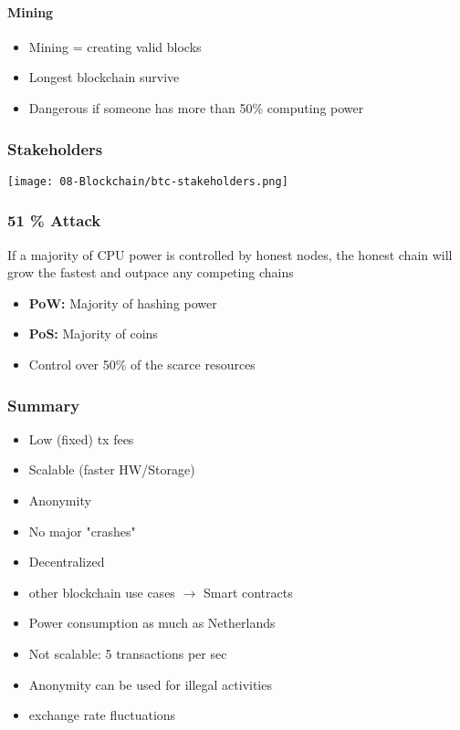 \paragraph{Mining}
\begin{itemize}
    \item Mining = creating valid blocks
    \item Longest blockchain survive
    \item Dangerous if someone has more than 50\% computing power
\end{itemize}

\subsubsection{Stakeholders}
\begin{center}
    \texttt{[image: 08-Blockchain/btc-stakeholders.png]}
\end{center}

\subsubsection{51 \% Attack}
If a majority of CPU power is controlled by honest nodes, the honest chain will grow the fastest and outpace any competing chains
\begin{itemize}
    \item \textbf{PoW:} Majority of hashing power
    \item \textbf{PoS:} Majority of coins
    \item Control over 50\% of the scarce resources
\end{itemize}


\subsubsection{Summary}
\begin{itemize}[label={\textcolor{ForestGreen}{+}}]
    \item Low (fixed) tx fees
    \item Scalable (faster HW/Storage)
    \item Anonymity
    \item No major "crashes"
    \item Decentralized
    \item other blockchain use cases $\rightarrow$ Smart contracts
\end{itemize}

\begin{itemize}[label={\textcolor{red}{--}}]
    \item Power consumption as much as Netherlands
    \item Not scalable: 5 transactions per sec
    \item Anonymity can be used for illegal activities
    \item exchange rate fluctuations
\end{itemize}


